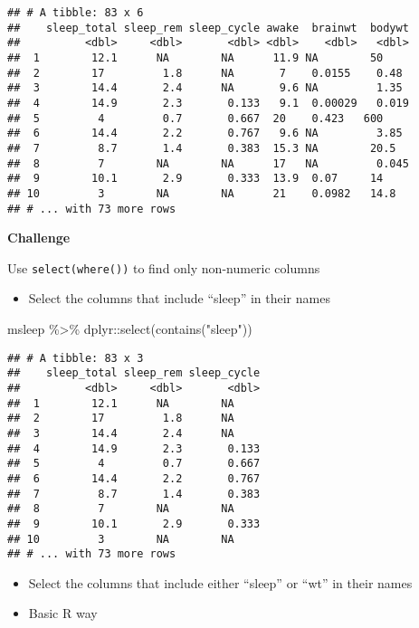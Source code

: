 \documentclass[
]{book}
\newenvironment{Shaded}{\begin{snugshade}}{\end{snugshade}}
\newcommand{\FunctionTok}[1]{\textcolor[rgb]{0.00,0.00,0.00}{#1}}
\newcommand{\NormalTok}[1]{#1}
\newcommand{\SpecialCharTok}[1]{\textcolor[rgb]{0.00,0.00,0.00}{#1}}
\newcommand{\StringTok}[1]{\textcolor[rgb]{0.31,0.60,0.02}{#1}}
\providecommand{\tightlist}{%
  \setlength{\itemsep}{0pt}\setlength{\parskip}{0pt}}
\begin{document}
\begin{verbatim}
## # A tibble: 83 x 6
##    sleep_total sleep_rem sleep_cycle awake  brainwt  bodywt
##          <dbl>     <dbl>       <dbl> <dbl>    <dbl>   <dbl>
##  1        12.1      NA        NA      11.9 NA        50    
##  2        17         1.8      NA       7    0.0155    0.48 
##  3        14.4       2.4      NA       9.6 NA         1.35 
##  4        14.9       2.3       0.133   9.1  0.00029   0.019
##  5         4         0.7       0.667  20    0.423   600    
##  6        14.4       2.2       0.767   9.6 NA         3.85 
##  7         8.7       1.4       0.383  15.3 NA        20.5  
##  8         7        NA        NA      17   NA         0.045
##  9        10.1       2.9       0.333  13.9  0.07     14    
## 10         3        NA        NA      21    0.0982   14.8  
## # ... with 73 more rows
\end{verbatim}

\textbf{Challenge}

Use \texttt{select(where())} to find only non-numeric columns

\begin{itemize}
\tightlist
\item
  Select the columns that include ``sleep'' in their names
\end{itemize}

\begin{Shaded}
\begin{Highlighting}[]
\NormalTok{msleep }\SpecialCharTok{\%\textgreater{}\%}
\NormalTok{  dplyr}\SpecialCharTok{::}\FunctionTok{select}\NormalTok{(}\FunctionTok{contains}\NormalTok{(}\StringTok{"sleep"}\NormalTok{))}
\end{Highlighting}
\end{Shaded}

\begin{verbatim}
## # A tibble: 83 x 3
##    sleep_total sleep_rem sleep_cycle
##          <dbl>     <dbl>       <dbl>
##  1        12.1      NA        NA    
##  2        17         1.8      NA    
##  3        14.4       2.4      NA    
##  4        14.9       2.3       0.133
##  5         4         0.7       0.667
##  6        14.4       2.2       0.767
##  7         8.7       1.4       0.383
##  8         7        NA        NA    
##  9        10.1       2.9       0.333
## 10         3        NA        NA    
## # ... with 73 more rows
\end{verbatim}

\begin{itemize}
\item
  Select the columns that include either ``sleep'' or ``wt'' in their names
\item
  Basic R way
\end{itemize}
\end{document}
